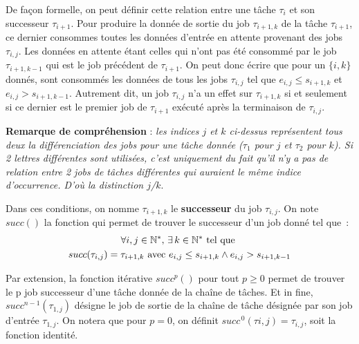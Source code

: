 \documentclass[french, a4paper, 11pt, twoside, pdftex]{StyleThese}
\begin{document}
	    De façon formelle, on peut définir cette relation entre une tâche $\tau_i$ et son successeur $\tau_{i+1}$. Pour produire la donnée de sortie du job $\tau_{i+1,k}$ de la tâche $\tau_{i+1}$, ce dernier consommes toutes les données d'entrée en attente provenant des jobs $\tau_{i,j}$. Les données en attente étant celles qui n'ont pas été consommé par le job $\tau_{i+1,k-1}$ qui est le job précédent de $\tau_{i+1}$. On peut donc écrire que pour un $\{i,k\}$ donnés, sont consommés les données de tous les jobs $\tau_{i,j}$ tel que $ e_{i,j} \leq s_{i+1, k}$ et $e_{i,j} > s_{i+1, k-1}$. Autrement dit, un job $\tau_{i,j}$ n'a un effet sur $\tau_{i+1,k}$ si et seulement si ce dernier est le premier job de $\tau_{i+1}$ exécuté après la terminaison de $\tau_{i,j}$.
	    
	    \textbf{Remarque de compréhension} : \textit{les indices $j$ et $k$ ci-dessus représentent tous deux la différenciation des jobs pour une tâche donnée ($\tau_1$ pour $j$ et $\tau_2$ pour $k$). Si 2 lettres différentes sont utilisées, c'est uniquement du fait qu'il n'y a pas de relation entre 2 jobs de tâches différentes qui auraient le même indice d'occurrence. D'où la distinction $j$/$k$}.
	    
		Dans ces conditions, on nomme $\tau_{i+1,k}$ le \textbf{successeur} du job $\tau_{i,j}$. On note $succ()$ la fonction qui permet de trouver le successeur d'un job donné tel que~: 
		\begin{multline*}
		\forall i,j \in \mathbb{N}^*, \, \exists \, k \in  \mathbb{N}^*  \textrm{ tel que }  \\
		 succ(\tau_{i,j}) = \tau_{i+1,k} \textup{ avec } e_{i,j} \leq s_{i+1,k} \wedge e_{i,j} > s_{i+1,k-1}
		\end{multline*}
	
	
		Par extension, la fonction itérative $succ^{p}()$ pour tout $p \geq 0$ permet de trouver le p job successeur d'une tâche donnée de la chaîne de tâches. Et in fine, $succ^{n-1}(\tau_{1,j})$ désigne le job de sortie de la chaîne de tâche désignée par son job d'entrée $\tau_{1,j}$. On notera que pour $p = 0$, on définit $succ^{\,0}(\tau{i,j}) = \tau_{i,j}$, soit la fonction identité.
		
\end{document}

